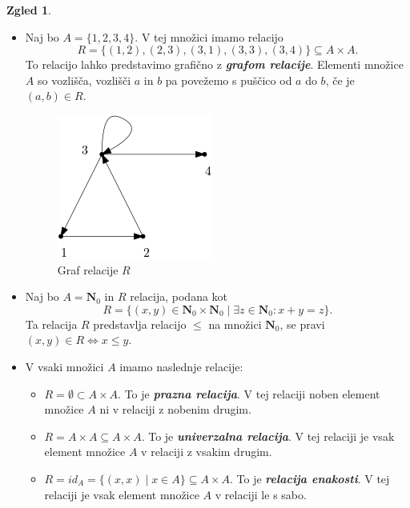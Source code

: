 \documentclass[11pt]{book}
\def\NN{\mathbf{N}}
\def\definicija{\color{rdeca}\bf\em}
\theoremstyle{definition}
\theoremstyle{zgled}
\newtheorem*{zgled}{Zgled}
\theoremstyle{odprtproblem}
\theoremstyle{domacanaloga}
\theoremstyle{izrek}
\begin{document}
\begin{zgled} \leavevmode
    \begin{itemize}
        \item Naj bo $A = \{ 1,2,3,4 \}$. V tej množici imamo relacijo
        \[
            R = \{ (1,2), (2,3), (3,1), (3,3), (3,4) \} \subseteq A \times A.
        \]
        To relacijo lahko predstavimo grafično z {\definicija grafom relacije}. Elementi množice $A$ so vozlišča, vozlišči $a$ in $b$ pa povežemo s puščico od $a$ do $b$, če je $(a,b) \in R$.

        \begin{figure}[h]
            \centering
            \includegraphics[width=0.3\linewidth]{img/relacije-graf.png}
            \caption{Graf relacije $R$}
        \end{figure}

        \item Naj bo $A = \NN_0$ in $R$ relacija, podana kot
        \[
            R = \{ (x,y) \in \NN_0 \times \NN_0 \mid \exists z \in \NN_0 \colon x + y = z \}.
        \]
        Ta relacija $R$ predstavlja relacijo $\leq$ na množici $\NN_0$, se pravi $(x,y) \in R \Leftrightarrow x \leq y$.

        \item V vsaki množici $A$ imamo naslednje relacije:
        \begin{itemize}
            \item $R = \emptyset \subset A \times A$. To je {\definicija prazna relacija}. V tej relaciji noben element množice $A$ ni v relaciji z nobenim drugim.
            \item $R = A \times A \subseteq A \times A$. To je {\definicija univerzalna relacija}. V tej relaciji je vsak element množice $A$ v relaciji z vsakim drugim.
            \item $R = id_A = \{ (x,x) \mid x \in A \} \subseteq A \times A$. To je {\definicija relacija enakosti}. V tej relaciji je vsak element množice $A$ v relaciji le s sabo.
        \end{itemize}
    \end{itemize}
\end{zgled}
\end{document}
